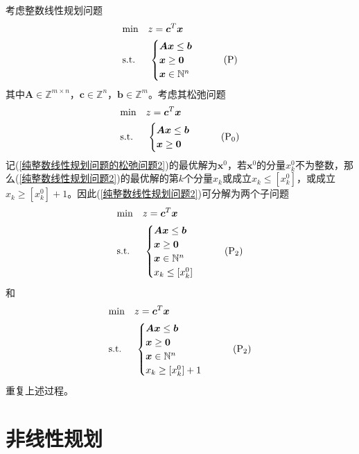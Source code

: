 \documentclass[lang = cn, scheme = chinese, thmcnt = section]{elegantbook}
\newcommand{\N}{\mathbb{N}}            %
\newcommand{\Z}{\mathbb{Z}}            %
\newcommand{\bs}{\boldsymbol}          %
\begin{document}
考虑整数线性规划问题
\begin{align*}\label{纯整数线性规划问题2}
	& \text{min}  \quad z=\bs{c}^T\bs{x}\\
	& \text{s.t.} \;\, \quad \begin{cases}
		\bs{A} \bs{x} \le \bs{b}\\
		\bs{x} \ge \bs{0}\\
		\bs{x}\in\N^n
	\end{cases}\tag{$\text{P}$}
\end{align*}
其中$\bs{A}\in\Z^{m\times n}$，$\bs{c}\in \Z^n$，$\bs{b}\in \Z^m$。考虑其松弛问题
\begin{align*}\label{纯整数线性规划问题的松弛问题2}
	& \text{min}  \quad z=\bs{c}^T\bs{x}\\
	& \text{s.t.} \;\, \quad \begin{cases}
		\bs{A} \bs{x} \le \bs{b}\\
		\bs{x} \ge \bs{0}
	\end{cases}\tag{$\text{P}_0$}
\end{align*}
记(\ref{纯整数线性规划问题的松弛问题2})的最优解为$\bs{x}^0$，若$\bs{x}^0$的分量$x_k^0$不为整数，那么(\ref{纯整数线性规划问题2})的最优解的第$k$个分量$x_k$或成立$x_k\le [x_k^0]$，或成立$x_k\ge [x_k^0]+1$。因此(\ref{纯整数线性规划问题2})可分解为两个子问题
\begin{align*}\label{纯整数线性规划问题的子问题1}
	& \text{min}  \quad z=\bs{c}^T\bs{x}\\
	& \text{s.t.} \;\, \quad \begin{cases}
		\bs{A} \bs{x} \le \bs{b}\\
		\bs{x} \ge \bs{0}\\
		\bs{x}\in\N^n\\
		x_k\le [x_k^0]
	\end{cases}\tag{$\text{P}_2$}
\end{align*}
和
\begin{align*}\label{纯整数线性规划问题的子问题2}
	& \text{min}  \quad z=\bs{c}^T\bs{x}\\
	& \text{s.t.} \;\, \quad \begin{cases}
		\bs{A} \bs{x} \le \bs{b}\\
		\bs{x} \ge \bs{0}\\
		\bs{x}\in\N^n\\
		x_k\ge [x_k^0]+1
	\end{cases}\tag{$\text{P}_2$}
\end{align*}
重复上述过程。

\chapter{非线性规划}
\end{document}
